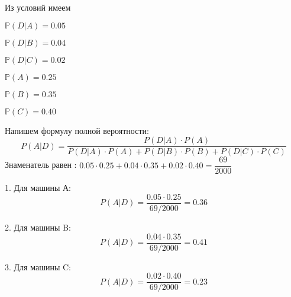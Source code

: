 \documentclass[a4paper,12pt]{article}
\newcommand{\bb}{\mathbb}
\begin{document}
Из условий имеем

$\bb P(D|A) = 0.05$

$\bb P(D|B) = 0.04$

$\bb P(D|C) = 0.02$

$\bb P(A) = 0.25$

$\bb P(B) = 0.35$

$\bb P(C) = 0.40$



Напишем формулу полной вероятности:
\[ P(A|D) = \dfrac{P(D|A)\cdot P(A)}{P(D|A)\cdot P(A) + P(D|B)\cdot P(B) + P(D|C)\cdot P(C)}\]
Знаменатель равен : $0.05\cdot 0.25 + 0.04\cdot 0.35 + 0.02 \cdot  0.40 = \dfrac{69}{2000}$


1. Для машины А:
	\[P(A|D) = \dfrac{0.05\cdot 0.25}{69/2000}  = 0.36\]

2. Для машины B:
	\[P(A|D) = \dfrac{0.04\cdot 0.35}{69/2000}  = 0.41\]

3. Для машины C:
	\[P(A|D) = \dfrac{0.02 \cdot  0.40}{69/2000}  = 0.23\]


\vspace{\baselineskip}
\end{document}
